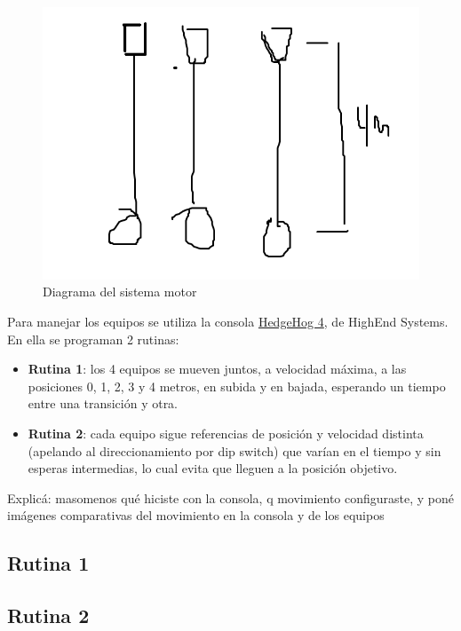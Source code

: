 \begin{figure}[!ht]
	\centering
	\includegraphics[width=15cm,scale=1]{resources/4_1-disposicionUpdowns.png}
	\caption{Diagrama del sistema motor}
	\label{fig:\thefigure}
\end{figure}

Para manejar los equipos se utiliza la consola \href{http://www.lighttrader.com/images/HI61020007_L.JPG}{HedgeHog 4}, de HighEnd Systems. En ella se programan 2 rutinas:
\begin{itemize}
	\item \textbf{Rutina 1}: los 4 equipos se mueven juntos, a velocidad máxima, a las posiciones 0, 1, 2, 3 y 4 metros, en subida y en bajada, esperando un tiempo entre una transición y otra.
	\item \textbf{Rutina 2}: cada equipo sigue referencias de posición y velocidad distinta (apelando al direccionamiento por dip switch) que varían en el tiempo y sin esperas intermedias, lo cual evita que lleguen a la posición objetivo.
\end{itemize}

\textcolor{FIXME}{Explicá: masomenos qué hiciste con la consola, q movimiento configuraste, y poné imágenes comparativas del movimiento en la consola y de los equipos}

\subsection{Rutina 1}

\subsection{Rutina 2}







